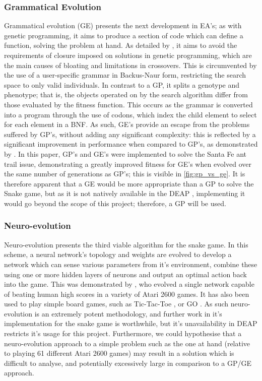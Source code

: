 \documentclass[british,10pt,a4paper]{article}
\begin{document}
\subsubsection{Grammatical Evolution}
Grammatical evolution (GE) presents the next development in EA's; as with genetic programming, it aims to produce a section of code which can define a function, solving the problem at hand. As detailed by \citet{ryan:1998:geepal}, it aims to avoid the requirements of closure imposed on solutions in genetic programming, which are the main causes of bloating and limitations in crossovers. This is circumvented by the use of a user-specific grammar in Backus-Naur form, restricting the search space to only valid individuals. In contrast to a GP, it splits a genotype and phenotype; that is, the objects operated on by the search algorithm differ from those evaluated by the fitness function. This occurs as the grammar is converted into a program through the use of codons, which index the child element to select for each element in a BNF.  As such, GE's provide an escape from the problems suffered by GP's, without adding any significant complexity: this is reflected by a significant improvement in performance when compared to GP's, as demonstrated by \citet{Michael_ONeill1999-zi}. In this paper, GP's and GE's were implemented to solve the Santa Fe ant trail issue, demonstrating a greatly improved fitness for GE's when evolved over the same number of generations as GP's; this is visible in \autoref{fig:gp_vs_ge}. It is therefore apparent that a GE would be more appropriate than a GP to solve the Snake game, but as it is not natively available in the DEAP \cite{deap}, implementing it would go beyond the scope of this project; therefore, a GP will be used.




\subsubsection{Neuro-evolution}
Neuro-evolution presents the third viable algorithm for the snake game. In this scheme, a neural network's topology and weights are evolved to develop a network which can sense various parameters from it's environment, combine these using one or more hidden layers of neurons and output an optimal action back into the game. This was demonstrated by \citet{Hausknecht2014-uc}, who evolved a single network capable of beating human high scores in a variety of Atari 2600 games. It has also been used to play simple board games, such as Tic-Tac-Toe \cite{Fogel1993-qp}, or GO \cite{Richards1998-si}. As such neuro-evolution is an extremely potent methodology, and further work in it's implementation for the snake game is worthwhile, but it's unavailability in DEAP restricts it's usage for this project. Furthermore, we could hypothesise that a neuro-evolution approach to a simple problem such as the one at hand (relative to playing 61 different Atari 2600 games) may result in a solution which is difficult to analyse, and potentially excessively large in comparison to a GP/GE approach.
\end{document}
